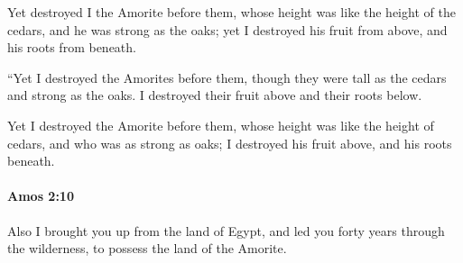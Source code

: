 			\begin{versebox}
					\item[BHS] 
					\item[LXX] 
					\item[ASV] Yet destroyed I the Amorite before them, whose height was like the height of the cedars, and he was strong as the oaks; yet I destroyed his fruit from above, and his roots from beneath.
					\item[NIV] “Yet I destroyed the Amorites before them, though they were tall as the cedars and strong as the oaks. I destroyed their fruit above and their roots below.
					\item[NRSV] Yet I destroyed the Amorite before them, whose height was like the height of cedars, and who was as strong as oaks; I destroyed his fruit above, and his roots beneath.
			\end{versebox}

		\paragraph{Amos 2:10} %
			\label{AMOS-2-10}

			Also I brought you up from the land of Egypt, and led you forty years through the wilderness, to possess the land of the Amorite.

